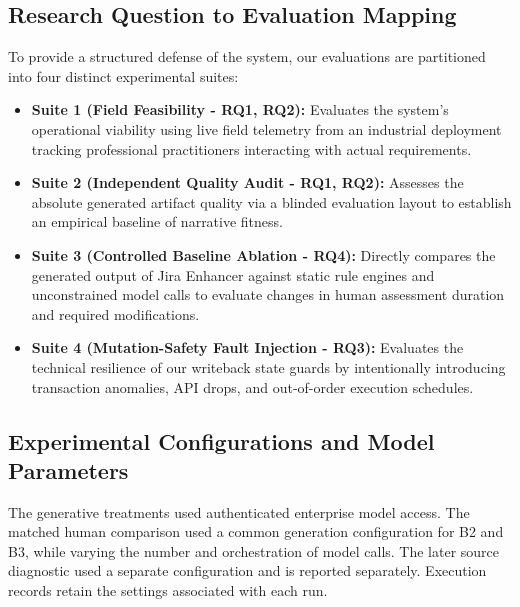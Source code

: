 \documentclass[manuscript,review]{acmart}
\begin{document}
\subsection{Research Question to Evaluation Mapping}
To provide a structured defense of the system, our evaluations are partitioned into four distinct experimental suites:
\begin{itemize}
    \item \textbf{Suite 1 (Field Feasibility - RQ1, RQ2):} Evaluates the system's operational viability using live field telemetry from an industrial deployment tracking professional practitioners interacting with actual requirements.
    \item \textbf{Suite 2 (Independent Quality Audit - RQ1, RQ2):} Assesses the absolute generated artifact quality via a blinded evaluation layout to establish an empirical baseline of narrative fitness.
    \item \textbf{Suite 3 (Controlled Baseline Ablation - RQ4):} Directly compares the generated output of Jira Enhancer against static rule engines and unconstrained model calls to evaluate changes in human assessment duration and required modifications.
    \item \textbf{Suite 4 (Mutation-Safety Fault Injection - RQ3):} Evaluates the technical resilience of our writeback state guards by intentionally introducing transaction anomalies, API drops, and out-of-order execution schedules.
\end{itemize}

\subsection{Experimental Configurations and Model Parameters}
The generative treatments used authenticated enterprise model access. The matched human comparison used a common generation configuration for B2 and B3, while varying the number and orchestration of model calls. The later source diagnostic used a separate configuration and is reported separately. Execution records retain the settings associated with each run.
\end{document}
